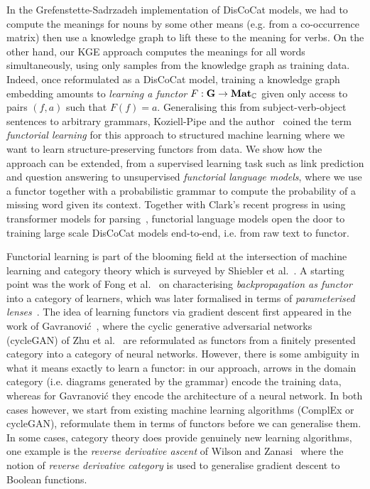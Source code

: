 In the Grefenstette-Sadrzadeh implementation of DisCoCat models, we had to compute the meanings for nouns by some other means (e.g. from a co-occurrence matrix) then use a knowledge graph to lift these to the meaning for verbs.
On the other hand, our KGE approach computes the meanings for all words simultaneously, using only samples from the knowledge graph as training data.
Indeed, once reformulated as a DisCoCat model, training a knowledge graph embedding amounts to \emph{learning a functor} $F : \mathbf{G} \to \mathbf{Mat}_{\mathbb{C}}$ given only access to pairs $(f, a)$ such that $F(f) = a$.
Generalising this from subject-verb-object sentences to arbitrary grammars, Koziell-Pipe and the author~\cite{ToumiKoziell-Pipe21} coined the term \emph{functorial learning} for this approach to structured machine learning where we want to learn structure-preserving functors from data.
We show how the approach can be extended, from a supervised learning task such as link prediction and question answering to unsupervised \emph{functorial language models}, where we use a functor together with a probabilistic grammar to compute the probability of a missing word given its context.
Together with Clark's recent progress in using transformer models for parsing~\cite{Clark21}, functorial language models open the door to training large scale DisCoCat models end-to-end, i.e. from raw text to functor.

Functorial learning is part of the blooming field at the intersection of machine learning and category theory which is surveyed by Shiebler et al.~\cite{ShieblerEtAl21}.
A starting point was the work of Fong et al.~\cite{FongEtAl17} on characterising \emph{backpropagation as functor} into a category of learners, which was later formalised in terms of \emph{parameterised lenses}~\cite[Lemma~2.13]{CruttwellEtAl21}.
The idea of learning functors via gradient descent first appeared in the work of Gavranović~\cite{Gavranovic19,Gavranovic19a}, where the cyclic generative adversarial networks (cycleGAN) of Zhu et al.~\cite{ZhuEtAl20} are reformulated as functors from a finitely presented category into a category of neural networks.
However, there is some ambiguity in what it means exactly to learn a functor: in our approach, arrows in the domain category (i.e. diagrams generated by the grammar) encode the training data, whereas for Gavranović they encode the architecture of a neural network.
In both cases however, we start from existing machine learning algorithms (ComplEx or cycleGAN), reformulate them in terms of functors before we can generalise them.
In some cases, category theory does provide genuinely new learning algorithms, one example is the \emph{reverse derivative ascent} of Wilson and Zanasi~\cite{WilsonZanasi20} where the notion of \emph{reverse derivative category} is used to generalise gradient descent to Boolean functions.
